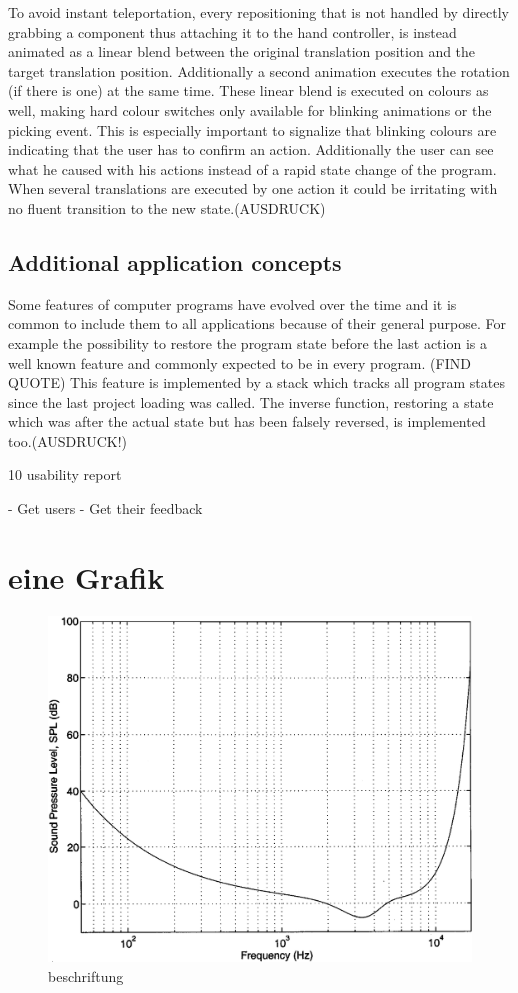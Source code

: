 \documentclass[hyperref,english,bachelorofscience,bibnum]{cgvpub}
\begin{document}
To avoid instant teleportation, every repositioning that is not handled by directly grabbing a component thus attaching it to the hand controller, is instead animated as a linear blend between the original translation position and the target translation position. Additionally a second animation executes the rotation (if there is one) at the same time.
These linear blend is executed on colours as well, making hard colour switches only available for blinking animations or the picking event. This is especially important to signalize that blinking colours are indicating that the user has to confirm an action. Additionally the user can see what he caused with his actions instead of a rapid state change of the program. When several translations are executed by one action it could be irritating with no fluent transition to the new state.(AUSDRUCK)

\subsection{Additional application concepts}

Some features of computer programs have evolved over the time and it is common to include them to all applications because of their general purpose. For example the possibility to restore the program state before the last action is a well known feature and commonly expected to be in every program. (FIND QUOTE)
This feature is implemented by a stack which tracks all program states since the last project loading was called. The inverse function, restoring a state which was after the actual state but has been falsely reversed, is implemented too.(AUSDRUCK!)


10 usability report

- Get users
- Get their feedback 

\section{eine Grafik}
\begin{figure}[htbp]
	\centering
		\includegraphics{test.png}
	\caption{beschriftung}
	\label{fig:diplominf}
\end{figure}
\end{document}
